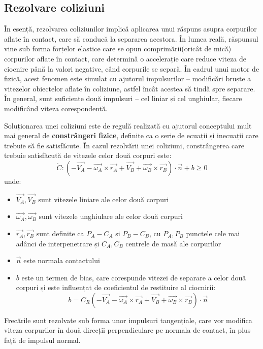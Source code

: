 \documentclass[12pt,a4paper]{report}
\begin{document}
\subsection{Rezolvare coliziuni}
În esență, rezolvarea coliziunilor implică aplicarea unui răspuns asupra corpurilor aflate în contact, care să conducă la separarea acestora. În lumea reală, răspunsul vine sub forma forțelor elastice care se opun comprimării(oricât de mică) corpurilor aflate în contact, care determină o accelerație care reduce viteza de ciocnire până la valori negative, când corpurile se separă. În cadrul unui motor de fizică, acest fenomen este simulat cu ajutorul impulsurilor -- modificări bruște a vitezelor obiectelor aflate în coliziune, astfel încât acestea să tindă spre separare. În general, sunt suficiente două impulsuri -- cel liniar și cel unghiular, fiecare modificând viteza corespondentă.

Soluționarea unei coliziuni este de regulă realizată cu ajutorul conceptului mult mai general de \textbf{constrângeri fizice}, definite ca o serie de ecuații și inecuații care trebuie să fie satisfăcute. În cazul rezolvării unei coliziuni, constrângerea care trebuie satisfăcută de vitezele celor două corpuri este:
$$ \dot{C} \colon \left( -\vec{V_A} - \vec{\omega_A} \times \vec{r_A} + \vec{V_B} + \vec{\omega_B} \times \vec{r_B} \right) \cdot \vec{n} + b\geq 0 $$unde:
\begin{itemize}
	\item $\vec{V_A}, \vec{V_B}$ sunt vitezele liniare ale celor două corpuri
	\item $\vec{\omega_A}, \vec{\omega_B}$ sunt vitezele unghiulare ale celor două corpuri
	\item $\vec{r_A}, \vec{r_B}$ sunt definite ca $P_A - C_A$ și $P_B - C_B$, cu $P_A,P_B$ punctele cele mai adânci de interpenetrare și $C_A, C_B$ centrele de masă ale corpurilor
	\item $\vec{n}$ este normala contactului
	\item $b$ este un termen de bias, care corespunde vitezei de separare a celor două corpuri și este influențat de coeficientul de restituire al ciocnirii: $$b = C_R\left( -\vec{V_A} - \vec{\omega_A} \times \vec{r_A} + \vec{V_B} + \vec{\omega_B} \times \vec{r_B} \right) \cdot \vec{n} $$
\end{itemize}

Frecările sunt rezolvate sub forma unor impulsuri tangențiale, care vor modifica viteza corpurilor în două direcții perpendiculare pe normala de contact, în plus față de impulsul normal.
\end{document}
